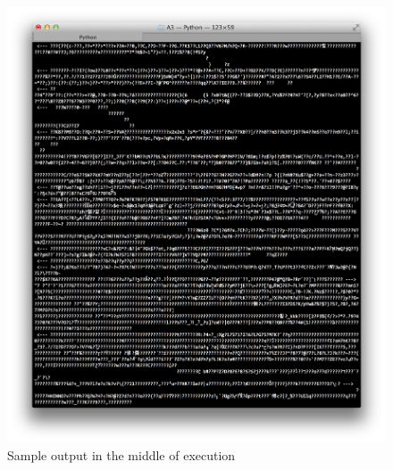 \documentclass[11pt]{article}
\begin{document}
	\begin{figure}[H]
	\includegraphics[scale=0.5, trim={0cm 0cm 0cm 0cm}, clip]{raw_output_mid}
	\caption{Sample output in the middle of execution}
	\end{figure}
	
\end{document}
